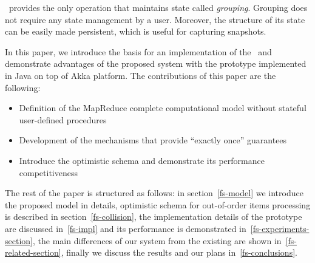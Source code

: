 \FlameStream\ provides the only operation that maintains state called {\it grouping}. Grouping does not require any state management by a user. Moreover, the structure of its state can be easily made persistent, which is useful for capturing snapshots.

In this paper, we introduce the basis for an implementation of the \FlameStream\ and demonstrate advantages of the proposed system with the prototype implemented in Java on top of Akka platform. The contributions of this paper are the following:

\begin {itemize}
\item Definition of the MapReduce complete computational model without stateful user-defined procedures
\item Development of the mechanisms that provide ``exactly once'' guarantees
\item Introduce the optimistic  schema and demonstrate its performance competitiveness
\end {itemize}

The rest of the paper is structured as follows: in section~\ref{fs-model} we introduce the proposed model in details, optimistic schema for out-of-order items processing is described in section~\ref{fs-collision}, the implementation details of the prototype are discussed in~\ref{fs-impl} and its performance is demonstrated in~\ref{fs-experiments-section}, the main differences of our system from the existing are shown in~\ref{fs-related-section}, finally we discuss the results and our plans in~\ref{fs-conclusions}.

\endinput
